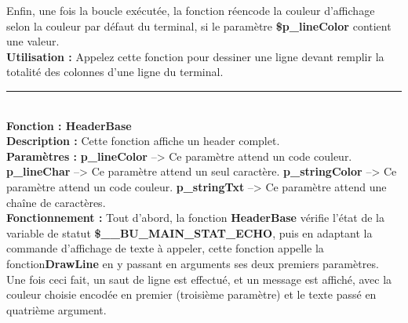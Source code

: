 \documentclass[a4paper,10pt]{article}
\begin{document}
Enfin, une fois la boucle exécutée, la fonction réencode la couleur d'affichage selon la couleur par\linebreak
défaut du terminal, si le paramètre \textbf{\color{orange}\$p\_lineColor\color{white}} contient une valeur.\\[1\baselineskip]

\textbf{Utilisation :}\linebreak
Appelez cette fonction pour dessiner une ligne devant remplir la totalité des colonnes d'une ligne du terminal.\\[2\baselineskip]


\color{mauve}\par\noindent\rule{\textwidth}{0.4pt}\color{white}\\[1\baselineskip]

\textbf{Fonction : \color{mauve}HeaderBase\color{white}}\\[1\baselineskip]
\textbf{Description :}\linebreak
Cette fonction affiche un header complet.\\[1\baselineskip]

\textbf{Paramètres :}\linebreak
\textbf{\color{orange}p\_lineColor\color{white}} --> Ce paramètre attend un code couleur.\linebreak
\textbf{\color{orange}p\_lineChar\color{white}} --> Ce paramètre attend un seul caractère.\linebreak
\textbf{\color{orange}p\_stringColor\color{white}} --> Ce paramètre attend un code couleur.\linebreak
\textbf{\color{orange}p\_stringTxt\color{white}} --> Ce paramètre attend une chaîne de caractères.\\[1\baselineskip]

\textbf{Fonctionnement :}\linebreak
Tout d'abord, la fonction \textbf{\color{mauve}HeaderBase\color{white}} vérifie l'état de la variable de statut \textbf{\color{orange}\$\_\_BU\_MAIN\_STAT\_ECHO\color{white}}, puis en adaptant la commande d'affichage de texte à appeler, cette fonction appelle la fonction\linebreak \textbf{\color{mauve}DrawLine\color{white}} en y passant en arguments ses deux premiers paramètres.\\[1\baselineskip]

Une fois ceci fait, un saut de ligne est effectué, et un message est affiché, avec la couleur choisie\linebreak
encodée en premier (troisième paramètre) et le texte passé en quatrième argument.\\[1\baselineskip]
\end{document}
